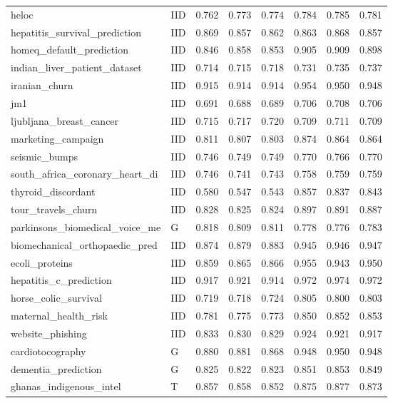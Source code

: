 \begin{longtable}{@{}p{3.95cm}lrrrrrr@{}}
heloc & IID & 0.762 & 0.773 & 0.774 & 0.784 & 0.785 & 0.781\\
hepatitis\_\allowbreak{}survival\_\allowbreak{}prediction & IID & 0.869 & 0.857 & 0.862 & 0.863 & 0.868 & 0.857\\
homeq\_\allowbreak{}default\_\allowbreak{}prediction & IID & 0.846 & 0.858 & 0.853 & 0.905 & 0.909 & 0.898\\
indian\_\allowbreak{}liver\_\allowbreak{}patient\_\allowbreak{}dataset & IID & 0.714 & 0.715 & 0.718 & 0.731 & 0.735 & 0.737\\
iranian\_\allowbreak{}churn & IID & 0.915 & 0.914 & 0.914 & 0.954 & 0.950 & 0.948\\
jm1 & IID & 0.691 & 0.688 & 0.689 & 0.706 & 0.708 & 0.706\\
ljubljana\_\allowbreak{}breast\_\allowbreak{}cancer & IID & 0.715 & 0.717 & 0.720 & 0.709 & 0.711 & 0.709\\
marketing\_\allowbreak{}campaign & IID & 0.811 & 0.807 & 0.803 & 0.874 & 0.864 & 0.864\\
seismic\_\allowbreak{}bumps & IID & 0.746 & 0.749 & 0.749 & 0.770 & 0.766 & 0.770\\
south\_\allowbreak{}africa\_\allowbreak{}coronary\_\allowbreak{}heart\_\allowbreak{}di & IID & 0.746 & 0.741 & 0.743 & 0.758 & 0.759 & 0.759\\
thyroid\_\allowbreak{}discordant & IID & 0.580 & 0.547 & 0.543 & 0.857 & 0.837 & 0.843\\
tour\_\allowbreak{}travels\_\allowbreak{}churn & IID & 0.828 & 0.825 & 0.824 & 0.897 & 0.891 & 0.887\\
parkinsons\_\allowbreak{}biomedical\_\allowbreak{}voice\_\allowbreak{}me & G & 0.818 & 0.809 & 0.811 & 0.778 & 0.776 & 0.783\\
\midrule
biomechanical\_\allowbreak{}orthopaedic\_\allowbreak{}pred & IID & 0.874 & 0.879 & 0.883 & 0.945 & 0.946 & 0.947\\
ecoli\_\allowbreak{}proteins & IID & 0.859 & 0.865 & 0.866 & 0.955 & 0.943 & 0.950\\
hepatitis\_\allowbreak{}c\_\allowbreak{}prediction & IID & 0.917 & 0.921 & 0.914 & 0.972 & 0.974 & 0.972\\
horse\_\allowbreak{}colic\_\allowbreak{}survival & IID & 0.719 & 0.718 & 0.724 & 0.805 & 0.800 & 0.803\\
maternal\_\allowbreak{}health\_\allowbreak{}risk & IID & 0.781 & 0.775 & 0.773 & 0.850 & 0.852 & 0.853\\
website\_\allowbreak{}phishing & IID & 0.833 & 0.830 & 0.829 & 0.924 & 0.921 & 0.917\\
cardiotocography & G & 0.880 & 0.881 & 0.868 & 0.948 & 0.950 & 0.948\\
dementia\_\allowbreak{}prediction & G & 0.825 & 0.822 & 0.823 & 0.851 & 0.853 & 0.849\\
ghanas\_\allowbreak{}indigenous\_\allowbreak{}intel & T & 0.857 & 0.858 & 0.852 & 0.875 & 0.877 & 0.873\\
\end{longtable}\endgroup
